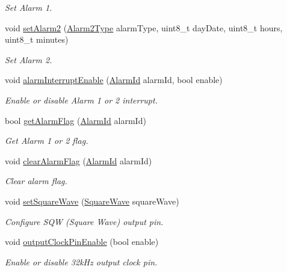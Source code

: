 \begin{DoxyCompactItemize}
\begin{DoxyCompactList}\small\item\em Set Alarm 1. \end{DoxyCompactList}\item 
void \hyperlink{class_d_s3231_a377799172e4f431288e18ff95cf5b7ec}{set\+Alarm2} (\hyperlink{_erriez_d_s3231_8h_a2561c628950a85b8f502b7055c3acd8b}{Alarm2\+Type} alarm\+Type, uint8\+\_\+t day\+Date, uint8\+\_\+t hours, uint8\+\_\+t minutes)
\begin{DoxyCompactList}\small\item\em Set Alarm 2. \end{DoxyCompactList}\item 
void \hyperlink{class_d_s3231_a0bcf130e164ba5436a71dbb81621fb35}{alarm\+Interrupt\+Enable} (\hyperlink{_erriez_d_s3231_8h_abdac868b647b120d540abd60d35e0feb}{Alarm\+Id} alarm\+Id, bool enable)
\begin{DoxyCompactList}\small\item\em Enable or disable Alarm 1 or 2 interrupt. \end{DoxyCompactList}\item 
bool \hyperlink{class_d_s3231_a77104765708a5f7ab9fbec7c17e145ea}{get\+Alarm\+Flag} (\hyperlink{_erriez_d_s3231_8h_abdac868b647b120d540abd60d35e0feb}{Alarm\+Id} alarm\+Id)
\begin{DoxyCompactList}\small\item\em Get Alarm 1 or 2 flag. \end{DoxyCompactList}\item 
void \hyperlink{class_d_s3231_ae70cc93049001d830b926491698fdfb6}{clear\+Alarm\+Flag} (\hyperlink{_erriez_d_s3231_8h_abdac868b647b120d540abd60d35e0feb}{Alarm\+Id} alarm\+Id)
\begin{DoxyCompactList}\small\item\em Clear alarm flag. \end{DoxyCompactList}\item 
void \hyperlink{class_d_s3231_a9d5ef58a83a5bde590bf414be67fb4a5}{set\+Square\+Wave} (\hyperlink{_erriez_d_s3231_8h_aa45f48b2c6f58f91a278a1601b211140}{Square\+Wave} square\+Wave)
\begin{DoxyCompactList}\small\item\em Configure S\+QW (Square Wave) output pin. \end{DoxyCompactList}\item 
void \hyperlink{class_d_s3231_a345592e12ccf5fc6c887c1414f8a3abb}{output\+Clock\+Pin\+Enable} (bool enable)
\begin{DoxyCompactList}\small\item\em Enable or disable 32k\+Hz output clock pin. \end{DoxyCompactList}\item 

\end{DoxyCompactItemize}
